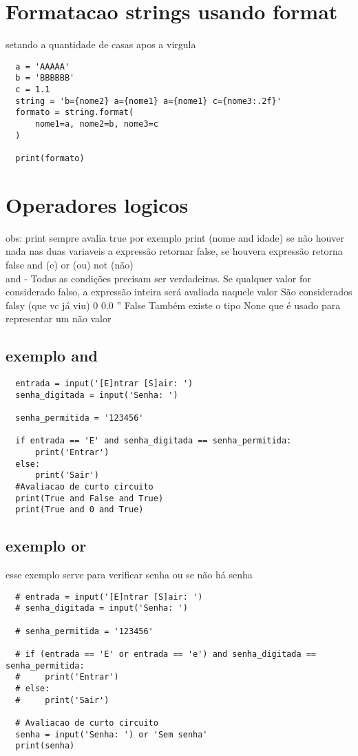 \documentclass[16pts]{article}
\begin{document}
\section{Formatacao strings usando format}  
setando a quantidade de casas apos a virgula
\begin{lstlisting}
  a = 'AAAAA'
  b = 'BBBBBB'
  c = 1.1
  string = 'b={nome2} a={nome1} a={nome1} c={nome3:.2f}'
  formato = string.format(
      nome1=a, nome2=b, nome3=c
  )
  
  print(formato)

\end{lstlisting}
\section{Operadores logicos}
obs: print sempre avalia true por exemplo print (nome and idade) se não houver nada nas duas variaveis 
a expressão retornar false, se houvera expressão retorna false
and (e) or (ou) not (não)\\
 and - Todas as condições precisam ser
 verdadeiras.
 Se qualquer valor for considerado falso,
 a expressão inteira será avaliada naquele valor
 São considerados falsy (que vc já viu)
 0 0.0 '' False
 Também existe o tipo None que é
 usado para representar um não valor\\
  \subsection{exemplo and}
  \begin{lstlisting}
  entrada = input('[E]ntrar [S]air: ')
  senha_digitada = input('Senha: ')

  senha_permitida = '123456'

  if entrada == 'E' and senha_digitada == senha_permitida:
      print('Entrar')
  else:
      print('Sair')
  #Avaliacao de curto circuito
  print(True and False and True)
  print(True and 0 and True)
  \end{lstlisting}
  \subsection{exemplo or}
  esse exemplo serve para verificar senha ou se não há senha
  \begin{lstlisting}
  # entrada = input('[E]ntrar [S]air: ')
  # senha_digitada = input('Senha: ')

  # senha_permitida = '123456'

  # if (entrada == 'E' or entrada == 'e') and senha_digitada == senha_permitida:
  #     print('Entrar')
  # else:
  #     print('Sair')

  # Avaliacao de curto circuito
  senha = input('Senha: ') or 'Sem senha'
  print(senha)
  \end{lstlisting} 
\end{document}
